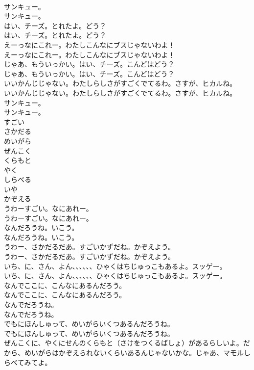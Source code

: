 \documentclass[8pt]{extreport}
\begin{document}
\begin{CJK}{UTF8}{min}
\\	サンキュー。
\\	サンキュー。
\\	はい、チーズ。とれたよ。どう？
\\	はい、チーズ。とれたよ。どう？
\\	えーっなにこれー。わたしこんなにブスじゃないわよ！
\\	えーっなにこれー。わたしこんなにブスじゃないわよ！
\\	じゃあ、もういっかい。はい、チーズ。こんどはどう？
\\	じゃあ、もういっかい。はい、チーズ。こんどはどう？
\\	いいかんじじゃない。わたしらしさがすごくでてるわ。さすが、ヒカルね。
\\	いいかんじじゃない。わたしらしさがすごくでてるわ。さすが、ヒカルね。
\\	サンキュー。
\\	サンキュー。
\\	すごい
\\	さかだる
\\	めいがら
\\	ぜんこく
\\	くらもと
\\	やく
\\	しらべる
\\	いや
\\	かぞえる
\\	うわーすごい。なにあれー。
\\	うわーすごい。なにあれー。
\\	なんだろうね。いこう。
\\	なんだろうね。いこう。
\\	うわー、さかだるだあ。すごいかずだね。かぞえよう。
\\	うわー、さかだるだあ。すごいかずだね。かぞえよう。
\\	いち、に、さん、よん、、、、、、ひゃくはちじゅっこもあるよ。スッゲー。
\\	いち、に、さん、よん、、、、、、ひゃくはちじゅっこもあるよ。スッゲー。
\\	なんでここに、こんなにあるんだろう。
\\	なんでここに、こんなにあるんだろう。
\\	なんでだろうね。
\\	なんでだろうね。
\\	でもにほんしゅって、めいがらいくつあるんだろうね。
\\	でもにほんしゅって、めいがらいくつあるんだろうね。
\\	ぜんこくに、やくにせんのくらもと（さけをつくるばしょ）があるらしいよ。だから、めいがらはかぞえられないくらいあるんじゃないかな。じゃあ、マモルしらべてみてよ。

\end{CJK}
\end{document}
